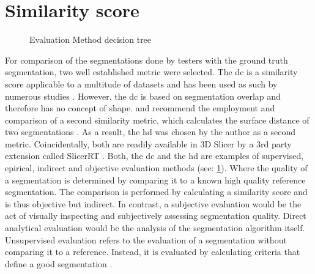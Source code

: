 \section{Similarity score}\label{s:similarity-score}
\begin{figure}[h!]
	
	\caption{Evaluation Method decision tree \cite{wangImageSegmentationEvaluation2020}}\label{fig:eval}
\end{figure}
\noindent
For comparison of the segmentations done by testers with the ground truth segmentation, two well established metric were selected.
The \acrfull{dc} is a similarity score applicable to a multitude of datasets and has been used as such by numerous studies \cite{setiawanImageSegmentationMetrics2020,atasPerformanceEvaluationJaccardDice2023}.
However, the \acrshort{dc} is based on segmentation overlap and therefore has no concept of shape.
 and \citeauthor{wangImageSegmentationEvaluation2020} recommend the employment and comparison of a second similarity metric, which calculates the surface distance of two segmentations \cite{aspertMESHMeasuringErrors2002,simBrainVentricleDetection2016}.
As a result, the \acrfull{hd} was chosen by the author as a second metric.
Coincidentally, both are readily available in 3D Slicer by a 3rd party extension called SlicerRT \cite{pinterSlicerRTRadiationTherapy2012}.
Both, the \acrlong{dc} and the \acrlong{hd} are examples of supervised, epirical, indirect and objective evaluation methods (see: \cref{fig:eval}).
Where the quality of a segmentation is determined by comparing it to a known high quality reference segmentation.
The comparison is performed by calculating a similarity score and is thus objective but indirect.
In contrast, a subjective evaluation would be the act of visually inspecting and subjectively assessing segmentation quality.
Direct analytical evaluation would be the analysis of the segmentation algorithm itself.
Unsupervised evaluation refers to the evaluation of a segmentation without comparing it to a reference.
Instead, it is evaluated by calculating criteria that define a good segmentation \cite{wangImageSegmentationEvaluation2020}.


